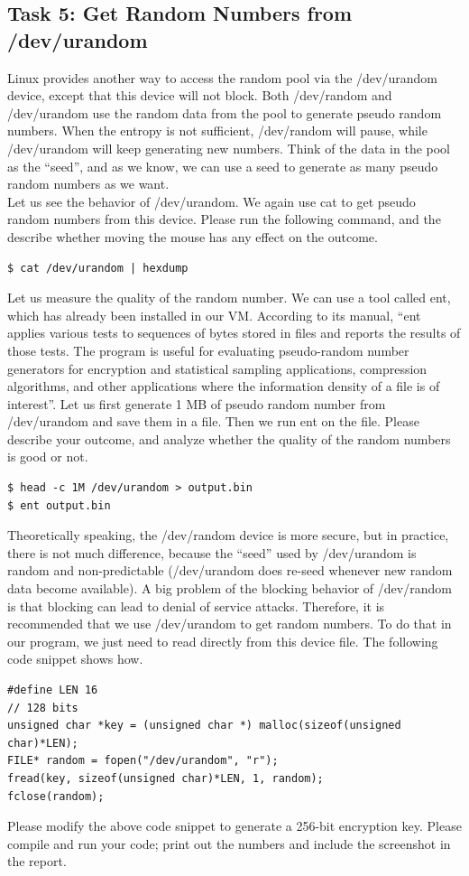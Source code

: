\documentclass[12pt]{article}
\newcommand\tab[1][0.5cm]{\hspace*{#1}}
\begin{document}
\subsection{Task 5: Get Random Numbers from /dev/urandom}
Linux provides another way to access the random pool via the /dev/urandom device, except that this
device will not block. Both /dev/random and /dev/urandom use the random data from the pool to
generate pseudo random numbers. When the entropy is not sufficient, /dev/random will pause, while
/dev/urandom will keep generating new numbers. Think of the data in the pool as the “seed”, and as we
know, we can use a seed to generate as many pseudo random numbers as we want. \\
\tab Let us see the behavior of /dev/urandom. We again use cat to get pseudo random numbers from
this device. Please run the following command, and the describe whether moving the mouse has any effect
on the outcome.
\begin{verbatim}
$ cat /dev/urandom | hexdump
\end{verbatim}
\tab Let us measure the quality of the random number. We can use a tool called ent, which has already been
installed in our VM. According to its manual, “ent applies various tests to sequences of bytes stored in files
and reports the results of those tests. The program is useful for evaluating pseudo-random number generators
for encryption and statistical sampling applications, compression algorithms, and other applications where
the information density of a file is of interest”. Let us first generate 1 MB of pseudo random number from
/dev/urandom and save them in a file. Then we run ent on the file. Please describe your outcome, and
analyze whether the quality of the random numbers is good or not.
\begin{verbatim}
$ head -c 1M /dev/urandom > output.bin
$ ent output.bin
\end{verbatim}
\tab Theoretically speaking, the /dev/random device is more secure, but in practice, there is not much
difference, because the “seed” used by /dev/urandom is random and non-predictable (/dev/urandom
does re-seed whenever new random data become available). A big problem of the blocking behavior of
/dev/random is that blocking can lead to denial of service attacks. Therefore, it is recommended that we
use /dev/urandom to get random numbers. To do that in our program, we just need to read directly from
this device file. The following code snippet shows how.
\begin{verbatim}
#define LEN 16
// 128 bits
unsigned char *key = (unsigned char *) malloc(sizeof(unsigned char)*LEN);
FILE* random = fopen("/dev/urandom", "r");
fread(key, sizeof(unsigned char)*LEN, 1, random);
fclose(random);
\end{verbatim}
\tab Please modify the above code snippet to generate a 256-bit encryption key. Please compile and run your
code; print out the numbers and include the screenshot in the report.
\end{document}
